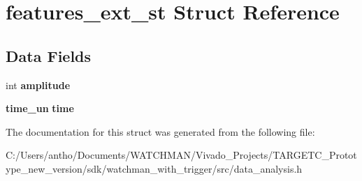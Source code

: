 \section{features\+\_\+ext\+\_\+st Struct Reference}
\label{structfeatures__ext__st}
\subsection*{Data Fields}
\begin{DoxyCompactItemize}
\item 
\mbox{\label{structfeatures__ext__st_ad07f93f796ba0af60659c528f7611d4a}} 
int {\bfseries amplitude}
\item 
\mbox{\label{structfeatures__ext__st_a68afe404040b1ba0bdaaac26efd70dbe}} 
\textbf{ time\+\_\+un} {\bfseries time}
\end{DoxyCompactItemize}


The documentation for this struct was generated from the following file\+:\begin{DoxyCompactItemize}
\item 
C\+:/\+Users/antho/\+Documents/\+W\+A\+T\+C\+H\+M\+A\+N/\+Vivado\+\_\+\+Projects/\+T\+A\+R\+G\+E\+T\+C\+\_\+\+Prototype\+\_\+new\+\_\+version/sdk/watchman\+\_\+with\+\_\+trigger/src/data\+\_\+analysis.\+h\end{DoxyCompactItemize}
